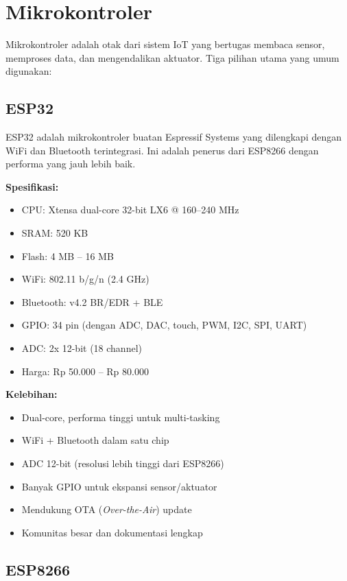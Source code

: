 \documentclass[12pt,a4paper,oneside]{report}
\begin{document}
\section{Mikrokontroler}

Mikrokontroler adalah otak dari sistem IoT yang bertugas membaca sensor, memproses data, dan mengendalikan aktuator. Tiga pilihan utama yang umum digunakan:

\subsection{ESP32}

ESP32 adalah mikrokontroler buatan Espressif Systems yang dilengkapi dengan WiFi dan Bluetooth terintegrasi. Ini adalah penerus dari ESP8266 dengan performa yang jauh lebih baik.

\textbf{Spesifikasi:}
\begin{itemize}
    \item CPU: Xtensa dual-core 32-bit LX6 @ 160--240 MHz
    \item SRAM: 520 KB
    \item Flash: 4 MB -- 16 MB
    \item WiFi: 802.11 b/g/n (2.4 GHz)
    \item Bluetooth: v4.2 BR/EDR + BLE
    \item GPIO: 34 pin (dengan ADC, DAC, touch, PWM, I2C, SPI, UART)
    \item ADC: 2x 12-bit (18 channel)
    \item Harga: Rp 50.000 -- Rp 80.000
\end{itemize}

\textbf{Kelebihan:}
\begin{itemize}
    \item Dual-core, performa tinggi untuk multi-tasking
    \item WiFi + Bluetooth dalam satu chip
    \item ADC 12-bit (resolusi lebih tinggi dari ESP8266)
    \item Banyak GPIO untuk ekspansi sensor/aktuator
    \item Mendukung OTA (\textit{Over-the-Air}) update
    \item Komunitas besar dan dokumentasi lengkap
\end{itemize}

\subsection{ESP8266}
\end{document}
